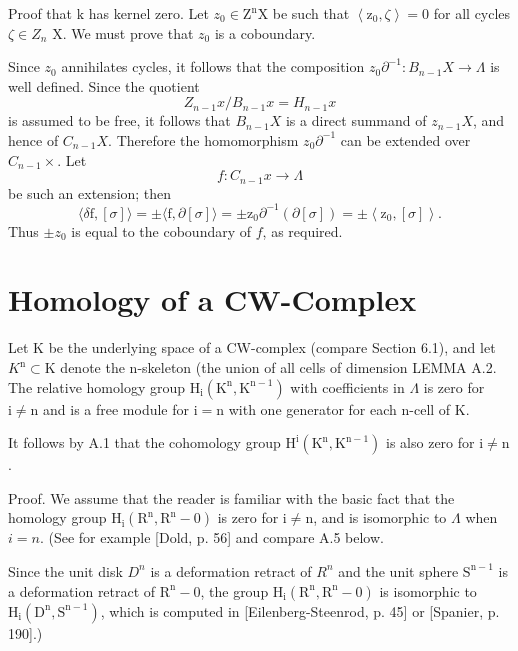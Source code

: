 \documentclass[10pt]{article}
\begin{document}
Proof that $\mathrm{k}$ has kernel zero. Let $z_{0} \in \mathrm{Z}^{\mathrm{n}} \mathrm{X}$ be such that $\left\langle\mathrm{z}_{0}, \zeta\right\rangle=0$ for all cycles $\zeta \in Z_{n}$ X. We must prove that $z_{0}$ is a coboundary.

Since $z_{0}$ annihilates cycles, it follows that the composition $z_{0} \partial^{-1}: B_{n-1} X \rightarrow \Lambda$ is well defined. Since the quotient
$$
Z_{n-1} x / B_{n-1} x=H_{n-1} x
$$
is assumed to be free, it follows that $B_{n-1} X$ is a direct summand of $z_{n-1} X$, and hence of $C_{n-1} X$. Therefore the homomorphism $z_{0} \partial^{-1}$ can be extended over $C_{n-1} \times$. Let
$$
f: C_{n-1} x \rightarrow \Lambda
$$
be such an extension; then
$$
\langle\delta \mathrm{f},[\sigma]\rangle=\pm\langle\mathrm{f}, \partial[\sigma]\rangle=\pm \mathrm{z}_{0} \partial^{-1}(\partial[\sigma])=\pm\left\langle\mathrm{z}_{0},[\sigma]\right\rangle .
$$
Thus $\pm z_{0}$ is equal to the coboundary of $f$, as required.

\section{Homology of a CW-Complex}
Let $\mathrm{K}$ be the underlying space of a CW-complex (compare Section 6.1), and let $K^{\mathrm{n}} \subset \mathrm{K}$ denote the $\mathrm{n}$-skeleton (the union of all cells of dimension LEMMA A.2. The relative homology group $\mathrm{H}_{\mathrm{i}}\left(\mathrm{K}^{\mathrm{n}}, \mathrm{K}^{\mathrm{n}-1}\right)$ with coefficients in $\Lambda$ is zero for $\mathrm{i} \neq \mathrm{n}$ and is a free module for $\mathrm{i}=\mathrm{n}$ with one generator for each $\mathrm{n}$-cell of $\mathrm{K}$.

It follows by A.1 that the cohomology group $\mathrm{H}^{\mathrm{i}}\left(\mathrm{K}^{\mathrm{n}}, \mathrm{K}^{\mathrm{n}-1}\right)$ is also zero for $\mathrm{i} \neq \mathrm{n}$.

Proof. We assume that the reader is familiar with the basic fact that the homology group $\mathrm{H}_{\mathrm{i}}\left(\mathrm{R}^{\mathrm{n}}, \mathrm{R}^{\mathrm{n}}-0\right)$ is zero for $\mathrm{i} \neq \mathrm{n}$, and is isomorphic to $\Lambda$ when $i=n$. (See for example [Dold, p. 56] and compare A.5 below.

Since the unit disk $D^{n}$ is a deformation retract of $R^{n}$ and the unit sphere $\mathrm{S}^{\mathrm{n}-1}$ is a deformation retract of $\mathrm{R}^{\mathrm{n}}-0$, the group $\mathrm{H}_{\mathrm{i}}\left(\mathrm{R}^{\mathrm{n}}, \mathrm{R}^{\mathrm{n}}-0\right)$ is isomorphic to $\mathrm{H}_{\mathrm{i}}\left(\mathrm{D}^{\mathrm{n}}, \mathrm{S}^{\mathrm{n}-1}\right)$, which is computed in [Eilenberg-Steenrod, p. 45] or [Spanier, p. 190].)
\end{document}
